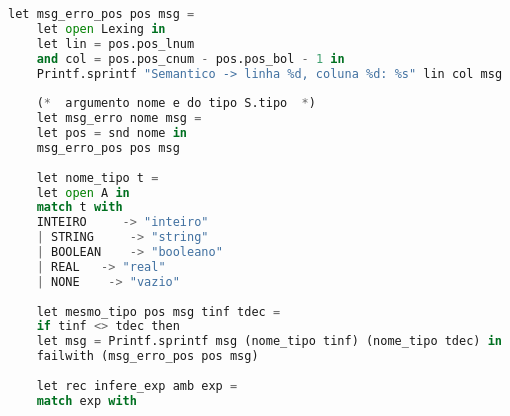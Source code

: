 \documentclass[hidelinks,12pt]{article}
\begin{document}
\begin{appendices}
\begin{lstlisting}[caption=semantico.mll, language=python]
	let msg_erro_pos pos msg =
	let open Lexing in
	let lin = pos.pos_lnum
	and col = pos.pos_cnum - pos.pos_bol - 1 in
	Printf.sprintf "Semantico -> linha %d, coluna %d: %s" lin col msg
	
	(*  argumento nome e do tipo S.tipo  *)
	let msg_erro nome msg =
	let pos = snd nome in 
	msg_erro_pos pos msg
	
	let nome_tipo t =
	let open A in
	match t with
	INTEIRO     -> "inteiro"
	| STRING     -> "string"
	| BOOLEAN    -> "booleano"
	| REAL   -> "real"
	| NONE    -> "vazio"
	
	let mesmo_tipo pos msg tinf tdec =
	if tinf <> tdec then
	let msg = Printf.sprintf msg (nome_tipo tinf) (nome_tipo tdec) in
	failwith (msg_erro_pos pos msg)
	
	let rec infere_exp amb exp =
	match exp with
	

\end{lstlisting}
\end{appendices}
\end{document}
